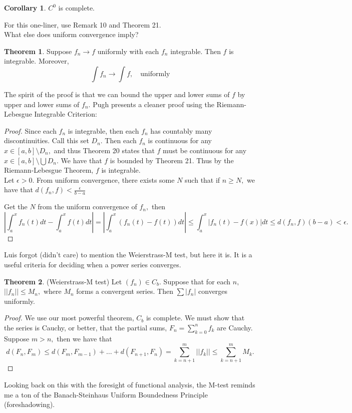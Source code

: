 \documentclass[10pt, oneside]{article}
\theoremstyle{definition}
\newtheorem{thm}{Theorem}
\newtheorem{cor}{Corollary}
\begin{document}
\begin{cor}
    $C^0$ is complete.
\end{cor}
For this one-liner, use Remark 10 and Theorem 21.\\
What else does uniform convergence imply?
\begin{thm}
    Suppose $f_n \to f$ uniformly with each $f_n$ integrable. Then $f$ is integrable. Moreover, 
    \[\int f_n \to \int f, \quad \text{uniformly}\]
\end{thm}
The spirit of the proof is that we can bound the upper and lower sums of $f$ by upper and lower sums of $f_n.$ Pugh presents a cleaner proof using the Riemann-Lebesgue Integrable Criterion:
\begin{proof}
    Since each $f_n$ is integrable, then each $f_n$ has countably many discontinuities. Call this set $D_n.$ Then each $f_n$ is continuous for any $x\in [a,b]\setminus D_n,$ and thus Theorem 20 states that $f$ must be continuous for any $x\in [a,b]\setminus \bigcup D_n.$ We have that $f$ is bounded by Theorem 21. Thus by the Riemann-Lebesgue Theorem, $f$ is integrable.\\
    Let $\epsilon>0.$ From uniform convergence, there exists some $N$ such that if $n\geq N,$ we have that $d(f_n, f)< \frac{\epsilon}{b-a}$
    
    Get the $N$ from the uniform convergence of $f_n,$ then 
    \[\left|\int_a^x f_n(t)dt  - \int_a^x f(t)dt\right| = \left| \int_a^x (f_n(t) - f(t))dt\right| \leq \int_a^x |f_n(t) - f(x)|dt \leq d(f_n, f)(b-a)< \epsilon.\]
\end{proof}
Luis forgot (didn't care) to mention the Weierstrass-M test, but here it is. It is a useful criteria for deciding when a power series converges. 
\begin{thm}
    (Weierstrass-M test) Let $(f_n)\in C_b.$ Suppose that for each $n,$ $||f_n||\leq M_n,$ where $M_n$ forms a convergent series. Then $\sum |f_n|$ converges uniformly. 
\end{thm}
\begin{proof}
    We use our most powerful theorem, $C_b$ is complete. We must show that the series is Cauchy, or better, that the partial sums, $F_n = \sum_{k=0}^n f_k$ are Cauchy. Suppose $m> n,$ then we have that
    \[d(F_n, F_m) \leq d(F_m, F_{m-1}) + \dots + d(F_{n+1}, F_n) = \sum_{k= n+1}^m ||f_k|| \leq \sum_{k=n+1}^m M_k.\]
\end{proof}
Looking back on this with the foresight of functional analysis, the M-test reminds me a ton of the Banach-Steinhaus Uniform Boundedness Principle (foreshadowing).
\end{document}
